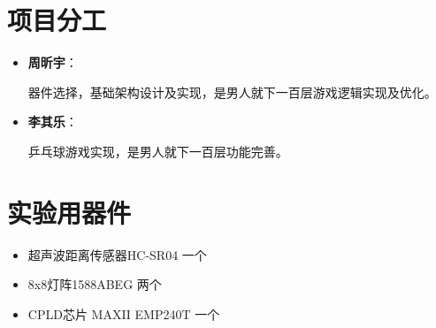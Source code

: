 \documentclass{article}
\begin{document}
\section{项目分工}
\begin{itemize}
	\item {\bf 周昕宇}：
		
		器件选择，基础架构设计及实现，是男人就下一百层游戏逻辑实现及优化。

	\item {\bf 李其乐}：

		乒乓球游戏实现，是男人就下一百层功能完善。
\end{itemize}


\section{实验用器件}
\begin{itemize}
	\item 超声波距离传感器HC-SR04 一个
	\item 8x8灯阵1588ABEG 两个
	\item CPLD芯片 MAXII EMP240T 一个
\end{itemize}
\end{document}
